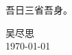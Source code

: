 \documentclass[../main.tex]{subfiles}
\begin{document}
吾日三省吾身。

\begin{flushright}
    吴尽思 \\ \today
\end{flushright}
\end{document}
